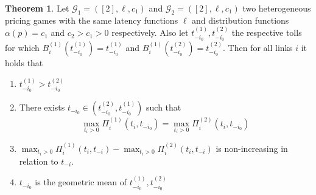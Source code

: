 \documentclass[10pt,a4paper]{book}
\newcommand{\Gm}{\mathcal{G}}
\theoremstyle{definition}
\newtheorem{theorem}[definition]{Theorem}
\theoremstyle{comment}
\begin{document}
\begin{theorem}
	\label{theorem:a_fixed_t_i0}
	Let $\Gm_1 = ([2], \ell, c_1)$ and $\Gm_2 = ([2], \ell, c_1)$ two heterogeneous pricing games with the same latency functions $\ell$ and distribution functions $\alpha(p) = c_1$ and $c_2 > c_1 > 0$ respectively.
	Also let $t_{-i_0}^{(1)}, t_{-i_0}^{(2)}$ the respective tolls for which $B_i^{(1)}(t_{-i_0}^{(1)}) = t_{-i_0}^{(1)}$ and $B_i^{(1)}(t_{-i_0}^{(2)}) = t_{-i_0}^{(2)}$.
	Then for all links $i$ it holds that
	\begin{enumerate}[$(i)$]
		\item $t_{-i_0}^{(1)} > t_{-i_0}^{(2)}$
		\item There exists $t_{-i_0} \in \left(t_{-i_0}^{(2)}, t_{-i_0}^{(1)}\right)$ such that
		\[\max_{t_i > 0}\Pi_i^{(1)}(t_i, t_{-i_0}) = \max_{t_i > 0}\Pi_i^{(2)}(t_i, t_{-i_0})\]
		\item $\max_{t_i > 0}\Pi_i^{(1)}(t_i, t_{-i}) - \max_{t_i > 0}\Pi_i^{(2)}(t_i, t_{-i})$ is non-increasing in relation to $t_{-i}$.
		\item $t_{-i_0}$ is the geometric mean of $t_{-i_0}^{(1)}, t_{-i_0}^{(2)}$
	\end{enumerate}
\end{theorem}
\end{document}
